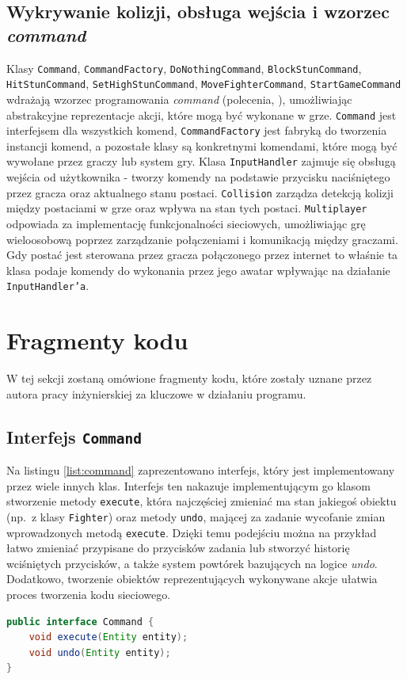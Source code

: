 \subsection{Wykrywanie kolizji, obsługa wejścia i wzorzec \emph{command}}
Klasy \texttt{Command}, \texttt{CommandFactory}, \texttt{DoNothingCommand}, \texttt{BlockStunCommand}, \texttt{HitStunCommand}, \texttt{SetHighStunCommand}, \texttt{MoveFighterCommand}, \texttt{StartGameCommand} wdrażają wzorzec programowania \emph{command} (polecenia, \cite{GPP}), umożliwiając abstrakcyjne reprezentacje akcji, które mogą być wykonane w grze. \texttt{Command} jest interfejsem dla wszystkich komend, \texttt{CommandFactory} jest fabryką do tworzenia instancji komend, a pozostałe klasy są konkretnymi komendami, które mogą być wywołane przez graczy lub system gry. Klasa \texttt{InputHandler} zajmuje się obsługą wejścia od użytkownika - tworzy komendy na podstawie przycisku naciśniętego przez gracza oraz aktualnego stanu postaci. \texttt{Collision} zarządza detekcją kolizji między postaciami w grze oraz wpływa na stan tych postaci. \texttt{Multiplayer} odpowiada za implementację funkcjonalności sieciowych, umożliwiając grę wieloosobową poprzez zarządzanie połączeniami i komunikacją między graczami. Gdy postać jest sterowana przez gracza połączonego przez internet to właśnie ta klasa podaje komendy do wykonania przez jego awatar wpływając na działanie \texttt{InputHandler'a}.

\section{Fragmenty kodu}
W tej sekcji zostaną omówione fragmenty kodu, które zostały uznane przez autora pracy inżynierskiej za kluczowe w działaniu programu.
\subsection{Interfejs \texttt{Command}}
Na listingu \ref{list:command} zaprezentowano interfejs, który jest implementowany przez wiele innych klas. Interfejs ten nakazuje implementującym go klasom stworzenie metody \texttt{execute}, która najczęściej zmieniać ma stan jakiegoś obiektu (np.\ z klasy \texttt{Fighter}) oraz metody \texttt{undo}, mającej za zadanie wycofanie zmian wprowadzonych metodą \texttt{execute}. Dzięki temu podejściu można na przykład łatwo zmieniać przypisane do przycisków zadania lub stworzyć historię wciśniętych przycisków, a także system powtórek bazujących na logice \emph{undo}. Dodatkowo, tworzenie obiektów reprezentujących wykonywane akcje ułatwia proces tworzenia kodu sieciowego.
\begin{lstlisting}[language=Java,style=JavaStyle,label=list:command,caption=Interfejs \texttt{Command},
                   basicstyle=\footnotesize\ttfamily]
public interface Command {
    void execute(Entity entity);
    void undo(Entity entity);
}
\end{lstlisting}

